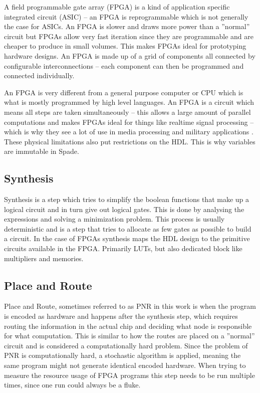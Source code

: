 A field programmable gate array (FPGA) is a kind of application specific integrated circuit (ASIC) -- an FPGA is reprogrammable which is not generally the case for ASICs. An FPGA is slower and draws more power than a ''normal'' circuit but FPGAs allow very fast iteration since they are programmable and are cheaper to produce in small volumes. This makes FPGAs ideal for prototyping hardware designs. An FPGA is made up of a grid of components all connected by configurable interconnections -- each component can then be programmed and connected individually. \cite{src:FPGA}

An FPGA is very different from a general purpose computer or CPU which is what is mostly programmed by high level languages. An FPGA is a circuit which means all steps are taken simultaneously -- this allows a large amount of parallel computations and makes FPGAs ideal for things like realtime signal processing -- which is why they see a lot of use in media processing and military applications \cite{src:FPGAApplications}. These physical limitations also put restrictions on the HDL. This is why variables are immutable in Spade.

\subsection{Synthesis}
Synthesis is a step which tries to simplify the boolean functions that make up a logical circuit and in turn give out logical gates. This is done by analysing the expressions and solving a minimization problem. This process is usually deterministic and is a step that tries to allocate as few gates as possible to build a circuit. In the case of FPGAs synthesis maps the HDL design to the primitive circuits available in the FPGA. Primarily LUTs, but also dedicated block like multipliers and memories.

\subsection{Place and Route}
Place and Route, sometimes referred to as PNR in this work is when the program is encoded as hardware and happens after the synthesis step, which requires routing the information in the actual chip and deciding what node is responsible for what computation. This is similar to how the routes are placed on a ''normal'' circuit and is considered a computationally hard problem. Since the problem of PNR is computationally hard, a stochastic algorithm is applied, meaning the same program might not generate identical encoded hardware. When trying to measure the resource usage of FPGA programs this step needs to be run multiple times, since one run could always be a fluke.
